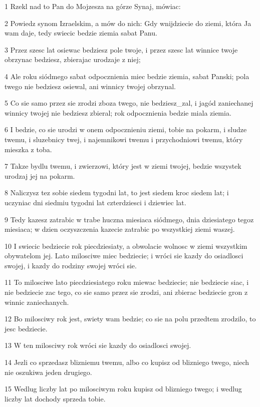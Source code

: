 \par 1 Rzekl nad to Pan do Mojzesza na górze Synaj, mówiac:
\par 2 Powiedz synom Izraelskim, a mów do nich: Gdy wnijdziecie do ziemi, która Ja wam daje, tedy swiecic bedzie ziemia sabat Panu.
\par 3 Przez szesc lat osiewac bedziesz pole twoje, i przez szesc lat winnice twoje obrzynac bedziesz, zbierajac urodzaje z niej;
\par 4 Ale roku siódmego sabat odpocznienia miec bedzie ziemia, sabat Panski; pola twego nie bedziesz osiewal, ani winnicy twojej obrzynal.
\par 5 Co sie samo przez sie zrodzi zboza twego, nie bedziesz_zal, i jagód zaniechanej winnicy twojej nie bedziesz zbieral; rok odpocznienia bedzie miala ziemia.
\par 6 I bedzie, co sie urodzi w onem odpocznieniu ziemi, tobie na pokarm, i sludze twemu, i sluzebnicy twej, i najemnikowi twemu i przychodniowi twemu, który mieszka z toba.
\par 7 Takze bydlu twemu, i zwierzowi, który jest w ziemi twojej, bedzie wszystek urodzaj jej na pokarm.
\par 8 Naliczysz tez sobie siedem tygodni lat, to jest siedem kroc siedem lat; i uczyniac dni siedmiu tygodni lat czterdziesci i dziewiec lat.
\par 9 Tedy kazesz zatrabic w trabe huczna miesiaca siódmego, dnia dziesiatego tegoz miesiaca; w dzien oczyszczenia kazecie zatrabic po wszystkiej ziemi waszej.
\par 10 I swiecic bedziecie rok piecdziesiaty, a obwolacie wolnosc w ziemi wszystkim obywatelom jej. Lato milosciwe miec bedziecie; i wróci sie kazdy do osiadlosci swojej, i kazdy do rodziny swojej wróci sie.
\par 11 To milosciwe lato piecdziesiatego roku miewac bedziecie; nie bedziecie siac, i nie bedziecie zac tego, co sie samo przez sie zrodzi, ani zbierac bedziecie gron z winnic zaniechanych.
\par 12 Bo milosciwy rok jest, swiety wam bedzie; co sie na polu przedtem zrodzilo, to jesc bedziecie.
\par 13 W ten milosciwy rok wróci sie kazdy do osiadlosci swojej.
\par 14 Jezli co sprzedasz blizniemu twemu, albo co kupisz od blizniego twego, niech nie oszukiwa jeden drugiego.
\par 15 Wedlug liczby lat po milosciwym roku kupisz od blizniego twego; i wedlug liczby lat dochody sprzeda tobie.
